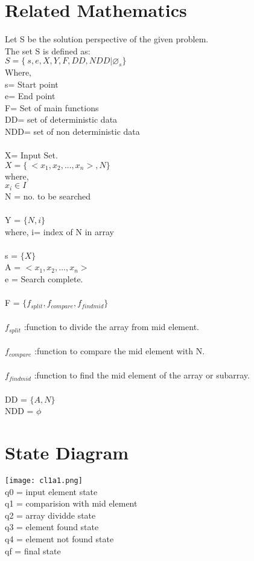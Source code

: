 \documentclass{article}
\begin{document}
\section{Related Mathematics}
Let S be the solution perspective of the given problem.
\\The set S is defined as:
\\$S=\lbrace\ s,e,X,Y,F,DD,NDD|\varnothing_{s}\rbrace$
\\Where,
\\s= Start point 
\\e= End point 
\\F= Set of main functions
\\DD= set of deterministic data
\\NDD= set of non deterministic data
\\\\X= Input Set.
\\$X=\lbrace\ <x_{1}, x_{2}, ... ,x_{n}>,N \rbrace$
\\where,
\\$x_{i} \in I$
\\N = no. to be searched
\\\\ Y = $\lbrace N, i \rbrace$
\\where, i= index of N in array 
\\\\ s = $\lbrace X \rbrace$
\\A = $<x_{1}, x_{2}, ... ,x_{n}>$
\\ e = Search complete.
\\\\ F = $\lbrace f_{split}, f_{compare}, f_{findmid} \rbrace$
\\\\$f_{split}$  :function to divide the array from mid element.
\\\\ $f_{compare}$ :function to compare the mid element with N.
\\\\ $f_{findmid}$ :function to find the mid element of the array or subarray.
\\\\ DD = $\lbrace A, N \rbrace$
\\ NDD = $\phi$


\section{State Diagram}
\texttt{[image: cl1a1.png]}
\\q0 = input element state
\\q1 = comparision with mid element
\\q2 = array dividde state
\\q3 = element found state
\\q4 = element not found state
\\qf = final state
\end{document}
